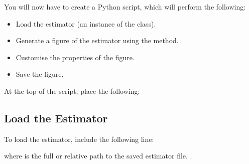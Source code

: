 \documentclass[letterpaper,10pt,english]{sphinxmanual}
\begin{document}
\sphinxAtStartPar
You will now have to create a Python script, which will perform the following:
\begin{itemize}
\item {} 
\sphinxAtStartPar
Load the estimator (an instance of the {\hyperref[\detokenize{references/core:nmrespy.core.Estimator}]{}} class).

\item {} 
\sphinxAtStartPar
Generate a figure of the estimator using the
{\hyperref[\detokenize{references/core:nmrespy.core.Estimator.plot_result}]{}} method.

\item {} 
\sphinxAtStartPar
Customise the properties of the figure.

\item {} 
\sphinxAtStartPar
Save the figure.

\end{itemize}

\sphinxAtStartPar
At the top of the script, place the following:

\begin{sphinxVerbatim}[commandchars=\\\{\}]
   
\end{sphinxVerbatim}


\subsection{Load the Estimator}
\label{\detokenize{misc/figure_customisation:load-the-estimator}}
\sphinxAtStartPar
To load the estimator, include the following line:

\begin{sphinxVerbatim}[commandchars=\\\{\}]
  
\end{sphinxVerbatim}

\sphinxAtStartPar
where  is the full or relative path to the saved estimator
file.   .
\end{document}
